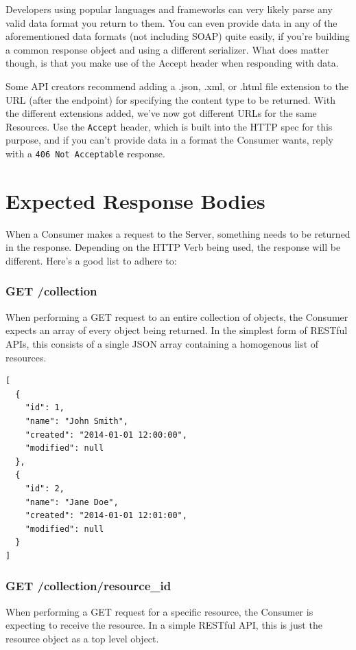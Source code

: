 \documentclass{book}
\begin{document}
Developers using popular languages and frameworks can very likely parse any valid data format you return to them. You can even provide data in any of the aforementioned data formats (not including SOAP) quite easily, if you're building a common response object and using a different serializer. What does matter though, is that you make use of the Accept header when responding with data.

Some API creators recommend adding a .json, .xml, or .html file extension to the URL (after the endpoint) for specifying the content type to be returned. With the different extensions added, we've now got different URLs for the same Resources. Use the \texttt{Accept} header, which is built into the HTTP spec for this purpose, and if you can't provide data in a format the Consumer wants, reply with a \texttt{406 Not Acceptable} response.


\section{Expected Response Bodies}

When a Consumer makes a request to the Server, something needs to be returned in the response. Depending on the HTTP Verb being used, the response will be different. Here's a good list to adhere to:

\subsubsection{GET /collection}

When performing a GET request to an entire collection of objects, the Consumer expects an array of every object being returned. In the simplest form of RESTful APIs, this consists of a single JSON array containing a homogenous list of resources.

\begin{verbatim}
[
  {
    "id": 1,
    "name": "John Smith",
    "created": "2014-01-01 12:00:00",
    "modified": null
  },
  {
    "id": 2,
    "name": "Jane Doe",
    "created": "2014-01-01 12:01:00",
    "modified": null
  }
]
\end{verbatim}

\subsubsection{GET /collection/resource\_id}

When performing a GET request for a specific resource, the Consumer is expecting to receive the resource. In a simple RESTful API, this is just the resource object as a top level object.
\end{document}
